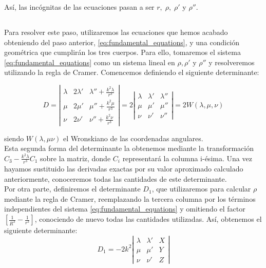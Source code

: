 \documentclass[11pt]{article}
\begin{document}
Así, las incógnitas de las ecuaciones pasan a ser $r, \; \rho, \; \rho'$ y $\rho''$.\\

\subsection{}
\label{subsec:distancias}
Para resolver este paso, utilizaremos las ecuaciones que hemos acabado obteniendo del paso anterior, \eqref{eq:fundamental_equations}, y una condición geométrica que cumplirán los tres cuerpos. Para ello, tomaremos el sistema \eqref{eq:fundamental_equations} como un sistema lineal en $\rho, \rho'$ y $\rho''$ y resolveremos utilizando la regla de Cramer. Comencemos definiendo el siguiente determinante:

\[
D =
\left|
\begin{array}{ccc}
	\lambda & 2\lambda' & \lambda''+\frac{k^2\lambda}{r^3}\\
	\mu & 2\mu' & \mu''+\frac{k^2\mu}{r^3}\\
	\nu & 2\nu' & \nu''+\frac{k^2\nu}{r^3}
\end{array}
\right|
=
2
\left|
\begin{array}{ccc}
	\lambda & \lambda' & \lambda''\\
	\mu & \mu' & \mu''\\
	\nu & \nu' & \nu''
\end{array}
\right|
=2W(\lambda,\mu,\nu)
\]

\noindent siendo $W(\lambda,\mu\nu)$ el Wronskiano de las coordenadas angulares.\\

Esta segunda forma del determinante la obtenemos mediante la transformación $C_3-\frac{k^2\lambda}{r^3}C_1$ sobre la matriz, donde $C_i$ representará la columna i-ésima. Una vez hayamos sustituido las derivadas exactas por su valor aproximado calculado anteriormente, conoceremos todas las cantidades de este determinante.\\

Por otra parte, definiremos el determinante $D_1$, que utilizaremos para calcular $\rho$ mediante la regla de Cramer, reemplazando la tercera columna por los términos independientes del sistema \eqref{eq:fundamental_equations} y omitiendo el factor $[\frac{1}{R^3}-\frac{1}{r^3}]$, conociendo de nuevo todas las cantidades utilizadas. Así, obtenemos el siguiente determinante:
\[
D_1 = -2k^2
\left|
\begin{array}{ccc}
\lambda & \lambda' & X\\
\mu & \mu' & Y\\
\nu & \nu' & Z
\end{array}
\right|
\]
\end{document}
